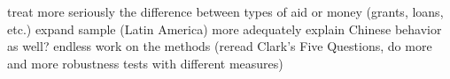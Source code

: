 treat more seriously the difference between types of aid or money (grants, loans, etc.)
expand sample (Latin America)
more adequately explain Chinese behavior as well?
endless work on the methods (reread Clark's Five Questions, do more and more robustness tests with different measures)